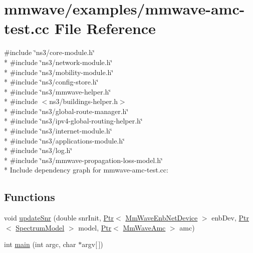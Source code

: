 \hypertarget{mmwave-amc-test_8cc}{}\section{mmwave/examples/mmwave-\/amc-\/test.cc File Reference}
\label{mmwave-amc-test_8cc}
{\ttfamily \#include \char`\"{}ns3/core-\/module.\+h\char`\"{}}\\*
{\ttfamily \#include \char`\"{}ns3/network-\/module.\+h\char`\"{}}\\*
{\ttfamily \#include \char`\"{}ns3/mobility-\/module.\+h\char`\"{}}\\*
{\ttfamily \#include \char`\"{}ns3/config-\/store.\+h\char`\"{}}\\*
{\ttfamily \#include \char`\"{}ns3/mmwave-\/helper.\+h\char`\"{}}\\*
{\ttfamily \#include $<$ns3/buildings-\/helper.\+h$>$}\\*
{\ttfamily \#include \char`\"{}ns3/global-\/route-\/manager.\+h\char`\"{}}\\*
{\ttfamily \#include \char`\"{}ns3/ipv4-\/global-\/routing-\/helper.\+h\char`\"{}}\\*
{\ttfamily \#include \char`\"{}ns3/internet-\/module.\+h\char`\"{}}\\*
{\ttfamily \#include \char`\"{}ns3/applications-\/module.\+h\char`\"{}}\\*
{\ttfamily \#include \char`\"{}ns3/log.\+h\char`\"{}}\\*
{\ttfamily \#include \char`\"{}ns3/mmwave-\/propagation-\/loss-\/model.\+h\char`\"{}}\\*
Include dependency graph for mmwave-\/amc-\/test.cc\+:
\subsection*{Functions}
\begin{DoxyCompactItemize}
\item 
void \hyperlink{mmwave-amc-test_8cc_acbc789d09623d926a18a031079a40297}{update\+Snr} (double snr\+Init, \hyperlink{classns3_1_1Ptr}{Ptr}$<$ \hyperlink{classns3_1_1MmWaveEnbNetDevice}{Mm\+Wave\+Enb\+Net\+Device} $>$ enb\+Dev, \hyperlink{classns3_1_1Ptr}{Ptr}$<$ \hyperlink{classns3_1_1SpectrumModel}{Spectrum\+Model} $>$ model, \hyperlink{classns3_1_1Ptr}{Ptr}$<$ \hyperlink{classns3_1_1MmWaveAmc}{Mm\+Wave\+Amc} $>$ amc)
\item 
int \hyperlink{mmwave-amc-test_8cc_a0ddf1224851353fc92bfbff6f499fa97}{main} (int argc, char $\ast$argv\mbox{[}$\,$\mbox{]})
\end{DoxyCompactItemize}
